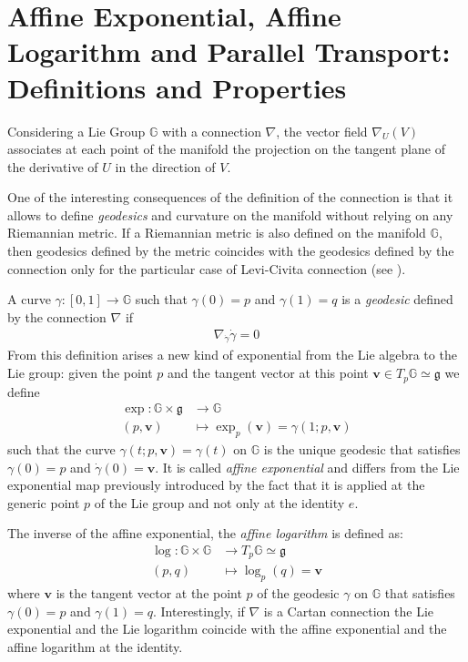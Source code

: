 \section{Affine Exponential, Affine Logarithm and Parallel Transport: Definitions and Properties}\label{se:pt}

Considering a Lie Group $\mathbb{G}$ with a connection $\nabla$, the vector field $\nabla_{U}(V)$ associates at each point of the manifold the projection on the tangent plane of the derivative of $U$ in the direction of $V$. 

One of the interesting consequences of the definition of the connection is that it allows to define \emph{geodesics} and curvature on the manifold without relying on any Riemannian metric. If a Riemannian metric is also defined on the manifold $\mathbb{G} $, then geodesics defined by the metric coincides with the geodesics defined by the connection only for the particular case of Levi-Civita connection (see \cite{do1992riemannian}). 

A curve $\gamma:[0,1]\rightarrow \mathbb{G}$ such that $\gamma(0)=p$ and $\gamma(1) = q$ is a \emph{geodesic} defined by the connection $\nabla$ if 
\begin{align}\label{def:geodesics_eq}
\nabla_{\dot{\gamma}}\dot{\gamma} = 0 %
\end{align}
From this definition arises a new kind of exponential from the Lie algebra to the Lie group: given the point $p$ and the tangent vector at this point $\mathbf{v} \in T_{p}\mathbb{G}\simeq \mathfrak{g}$ we define 
\begin{align*}
\exp :  \mathbb{G}  \times \mathfrak{g}     &\longrightarrow \mathbb{G}  
\\ 
(p,\mathbf{v}) &\longmapsto \exp_{p}(\mathbf{v})  = \gamma(1; p,\mathbf{v})
\end{align*}
such that the curve $\gamma(t;p,\mathbf{v}) = \gamma(t)$ on $\mathbb{G}$ is the unique geodesic that satisfies $\gamma(0) = p$ and $\dot{\gamma}(0) =  \mathbf{v} $.
It is called \emph{affine exponential} and differs from the Lie exponential map previously introduced by the fact that it is applied at the generic point $p$ of the Lie group and not only at the identity $e$.

\noindent
The inverse of the affine exponential, the \emph{affine logarithm} is defined as:
\begin{align*}
\log :  \mathbb{G}  \times \mathbb{G}  & \longrightarrow T_{p}\mathbb{G}   \simeq \mathfrak{g} 
\\ 
(p,q) &\longmapsto \log_{p}(q)  = \mathbf{v} 
\end{align*}
where $\mathbf{v} $ is the tangent vector at the point $p$ of the geodesic $\gamma$ on $\mathbb{G} $ that satisfies $\gamma(0) = p$ and $\gamma(1) = q$. Interestingly, if $\nabla$ is a Cartan connection the Lie exponential and the Lie logarithm coincide with the affine exponential and the affine logarithm at the identity.

